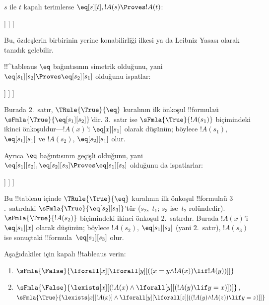 \documentclass[../../../include/open-logic-section]{subfiles}
\begin{document}
\begin{ex}
$s$ ile $t$ kapalı terimlerse $\eq[s][t], !A(s) \Proves !A(t)$:
\begin{oltableau}
  [\sFmla{\False}{\formula{A}(t)}, just = \TAss
    [\sFmla{\True}{\eq[s][t]}, just = \TAss
      [\sFmla{\True}{\formula{A}(s)}, just = \TAss
        [\sFmla{\True}{\formula{A}(t)}, just={\TRule{\True}{\eq}[2, 3]}, close]
      ]
    ]
  ]
\end{oltableau}
Bu, özdeşlerin birbirinin yerine konabilirliği ilkesi ya da Leibniz Yasası
olarak tanıdık gelebilir.

!!^{tableau}s $\eq$ bağıntısının simetrik olduğunu, yani
$\eq[s_1][s_2] \Proves \eq[s_2][s_1]$ olduğunu ispatlar:
\begin{oltableau}
  [\sFmla{\False}{\eq[s_2][s_1]}, just = \TAss
    [\sFmla{\True}{\eq[s_1][s_2]}, just = \TAss
      [\sFmla{\True}{\eq[s_1][s_1]}, just = {$\eq$}
        [\sFmla{\True}{\eq[s_2][s_1]}, just = {\TRule{\True}{\eq}[2, 3]}, close]
      ]
    ]
  ]
\end{oltableau}
Burada $2$.~satır, $\TRule{\True}{\eq}$ kuralının ilk önkoşul
!!{formula}{}ü~$\sFmla{\True}{\eq[s_1][s_2]}$'dir. $3$.~satır ise
$\sFmla{\True}{!A(s_1)}$ biçimindeki ikinci önkoşuldur---$!A(x)$'i
$\eq[x][s_1]$ olarak düşünün; böylece $!A(s_1)$, $\eq[s_1][s_1]$ ve
$!A(s_2)$, $\eq[s_2][s_1]$ olur.

Ayrıca $\eq$ bağıntısının geçişli olduğunu, yani $\eq[s_1][s_2],
\eq[s_2][s_3] \Proves \eq[s_1][s_3]$ olduğunu da ispatlarlar:
\begin{oltableau}
  [\sFmla{\False}{\eq[s_1][s_3]}, just = \TAss
    [\sFmla{\True}{\eq[s_1][s_2]}, just = \TAss
      [\sFmla{\True}{\eq[s_2][s_3]}, just = \TAss
        [\sFmla{\True}{\eq[s_1][s_3]}, just = {\TRule{\True}{\eq}[3, 2]}, close]
      ]
    ]
  ]
\end{oltableau}
Bu !!{tableau} içinde $\TRule{\True}{\eq}$ kuralının ilk önkoşul
!!{formula}{}ü $3$.~satırdaki $\sFmla{\True}{\eq[s_2][s_3]}$'tür
($s_2$,~$t_1$; $s_3$ ise~$t_2$ rolündedir). $\sFmla{\True}{!A(s_2)}$
biçimindeki ikinci önkoşul $2$.~satırdır. Burada $!A(x)$'i
$\eq[s_1][x]$ olarak düşünün; böylece $!A(s_2)$, $\eq[s_1][s_2]$ (yani
$2$.~satır), $!A(s_3)$ ise sonuçtaki !!{formula}~$\eq[s_1][s_3]$ olur.
\end{ex}

\begin{prob}
Aşağıdakiler için kapalı !!{tableau}s verin:
\begin{enumerate}
\item $\sFmla{\False}{\lforall[x][\lforall[y][((x = y \land !A(x))
      \lif !A(y))]]}$
\item $\sFmla{\False}{\lexists[x][(!A(x) \land
    \lforall[y][(!A(y) \lif y = x)])]}$,\\
  $\sFmla{\True}{\lexists[x][!A(x)] \land
    \lforall[y][\lforall[z][((!A(y) \land !A(z)) \lif y = z)]]}$
\end{enumerate}
\end{prob}
\end{document}

